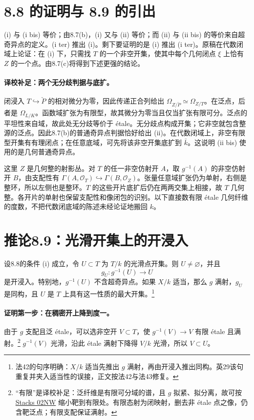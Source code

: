 \documentclass[openany,fontset=fandol]{ctexbook}
\newcommand{\PD}{\check P}
\begin{document}
\newpage
\section*{8.8 的证明与 8.9 的引出}
(i) 与 (i bis) 等价；由8.7(b)，(i) 又与 (ii) 等价；而 (ii) 与 (ii bis) 的等价来自超奇异点的定义。(i ter) 推出 (i)。剩下要证明的是 (i) 推出 (i ter)。原稿在代数闭域上论证：在 (i) 下，只需找 $T$ 的一个非空开集，使其中每个几何闭点 $\xi$ 上恰有 $Z$ 的一个点。由8.7(c)将得到下述更强的结论。

\paragraph{译校补足：两个无分歧判据与底扩。}
闭浸入 $T\hookrightarrow\PD$ 的相对微分为零，因此传递正合列给出
$\Omega_{Z/\PD}\simeq\Omega_{Z/T}$。在泛点，后者是 $\Omega_{L/K}$。函数域扩张为有限型，故其微分为零当且仅当扩张有限可分。泛点的平坦性来自域，故此处无分歧等价于 étale。无分歧点构成开集；它非空就包含整源的泛点。因此8.7(b)的普通奇异点判据恰好给出 (ii)。在代数闭域上，非空有限型开集有有理闭点；在任意底域，可先将该非空开集底扩到 $\bar k$。这说明 (ii bis) 使用的是几何普通奇异点。

这里 $Z$ 是几何整的射影丛。对 $T$ 的任一非空仿射开 $A$，取 $g^{-1}(A)$ 的非空仿射开 $B$，由支配性有 $\Gamma(A,\mathcal O_T)\hookrightarrow\Gamma(B,\mathcal O_Z)$。张量任意域扩张仍为单射，右侧是整环，所以左侧也是整环。$T$ 的这些开片底扩后仍在两两交集上相接，故 $T$ 几何整。各开片的单射也保留支配性和像闭包的识别。以下直接数有限 étale 几何纤维的度数，不把代数闭底域的陈述未经论证地搬回 $k$。

\section*{推论8.9：光滑开集上的开浸入}
设8.8的条件 (i) 成立，令 $U\subset T$ 为 $T/k$ 的光滑点开集。则 $U\ne\varnothing$，并且
\[
 g_U: g^{-1}(U)\longrightarrow U
\]
是开浸入。特别地，$g^{-1}(U)$ 不含超奇异点。如果 $X/k$ 适当，那么 $g$ 满射，$g_U$ 是同构，且 $U$ 是 $T$ 上具有这一性质的最大开集。\footnote{法42的句序明确：$X/k$ 适当先推出 $g$ 满射，再由开浸入推出同构。英29该句重复并夹入适当性的误接，正文按法42与法43修复。}

\paragraph{证明第一步：在稠密开上降到度一。}
由于 $g$ 支配且泛 étale，可以选非空开 $V\subset T$，使 $g^{-1}(V)\to V$ 有限 étale 且满射。\footnote{“有限”是译校补足：泛纤维是有限可分域的谱，且 $g$ 拟紧、拟分离，故可按 \href{https://stacks.math.columbia.edu/tag/02NW}{Stacks 02NW} 缩小靶到有限处。有限态射为闭映射，删去非 étale 点之像，仍含靶泛点；有限支配保证满射。} $g^{-1}(V)$ 光滑，沿此 étale 满射下降得 $V/k$ 光滑，所以 $V\subset U$。
\end{document}

